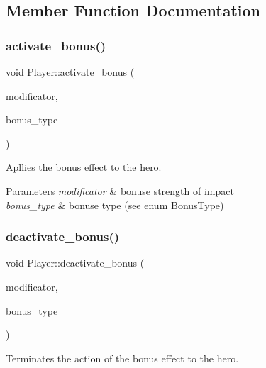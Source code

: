 \subsection{Member Function Documentation}
\mbox{\label{class_player_a18c12a3d320a15d87539cd6de2acca66}} 
\subsubsection{\texorpdfstring{activate\+\_\+bonus()}{activate\_bonus()}}
{\footnotesize\ttfamily void Player\+::activate\+\_\+bonus (\begin{DoxyParamCaption}\item[{double}]{modificator,  }\item[{\hyperlink{_bonus_8h_ad6d58ebabfbf9aa4181bfe97a5d8d984}{Bonus\+Type}}]{bonus\+\_\+type }\end{DoxyParamCaption})}



Apllies the bonus effect to the hero. 


\begin{DoxyParams}{Parameters}
{\em modificator} & bonuse strength of impact \\
\hline
{\em bonus\+\_\+type} & bonuse type (see enum Bonus\+Type) \\
\hline
\end{DoxyParams}
\mbox{\label{class_player_a984c3a87de751efe818203bb01e8d5e9}} 
\subsubsection{\texorpdfstring{deactivate\+\_\+bonus()}{deactivate\_bonus()}}
{\footnotesize\ttfamily void Player\+::deactivate\+\_\+bonus (\begin{DoxyParamCaption}\item[{double}]{modificator,  }\item[{\hyperlink{_bonus_8h_ad6d58ebabfbf9aa4181bfe97a5d8d984}{Bonus\+Type}}]{bonus\+\_\+type }\end{DoxyParamCaption})}



Terminates the action of the bonus effect to the hero. 


